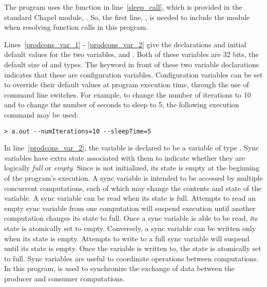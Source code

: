 The program uses the  function in line~\ref{sleep_call}, which is 
provided in the
standard Chapel module, .  So, the first line, , 
is needed to include the  module when resolving 
function calls in this program.  

Lines~\ref{prodcons_var_1} - \ref{prodcons_var_2} give the declarations 
and initial default values
for the two variables,  and .
Both of these variables are 32 bits, the default size of  and  types.
The  keyword in front of these two variable declarations 
indicates that these are configuration variables.  Configuration variables 
can be set to override their default values at program execution time, through the 
use of command line switches.  For example, to change the number of iterations to 10
and to change the number of seconds to sleep to 5, the following execution command 
may be used:
\small{
\begin{verbatim}
> a.out --numIterations=10 --sleepTime=5
\end{verbatim}}

In line~\ref{prodcons_var_2}, the variable  is 
declared to be a  variable 
of type .  Sync variables have extra state associated with them to 
indicate whether they are logically {\em full} or {\em empty}.  Since 
is not initialized, its state is empty at the beginning of the program's execution.
A sync variable
is intended to be accessed by multiple concurrent computations, each of which may
change the contents and state of the variable.  A sync variable
can be read when its state is full.  Attempts to read an empty sync variable from one
computation will suspend execution until another computation changes its state to full.  
Once a sync variable is able to be read, its state is atomically set to empty.  
Conversely, a sync variable can be written only when its state is empty.  Attempts
to write to a full sync variable will suspend until its state is empty.  Once the variable
is written to, the state is atomically set to full.  Sync variables are useful
to coordinate operations between computations.  In this program,  is used
to synchronize the exchange of data between the producer and consumer computations.

